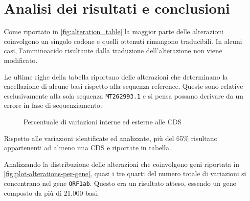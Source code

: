 \documentclass[11pt,italian]{article}
\begin{document}
\newpage
\section{Analisi dei risultati e conclusioni}
Come riportato in \cref{fig:alteration_table} la maggior parte delle alterazioni coinvolgono un singolo codone e quelli ottenuti rimangono traducibili. In alcuni casi, l'amminoacido risultante dalla traduzione dell'alterazione non viene modificato.

Le ultime righe della tabella riportano delle alterazioni che determinano la cacellazione di alcune basi rispetto alla sequenza reference.
Queste sono relative esclusivamente alla sola sequenza \lstinline{MT262993.1} e si pensa possano derivare da un errore in fase di sequenziamento.

\begin{figure}[H]
  \caption{Percentuale di variazioni interne ed esterne alle CDS}
  \label{fig:plot-alterations-in-cds}
\end{figure}

Rispetto alle variazioni identificate ed analizzate, più del 65\% risultano appartenenti ad almeno una CDS e riportate in tabella.

Analizzando la distribuzione delle alterazioni che coinvolgono geni riportata in \cref{fig:plot-alterations-per-gene}, quasi i tre quarti del numero totale di variazioni si concentrano nel gene \lstinline{ORF1ab}. Questo era un risultato atteso, essendo un gene composto da più di 21.000 basi.
\end{document}
